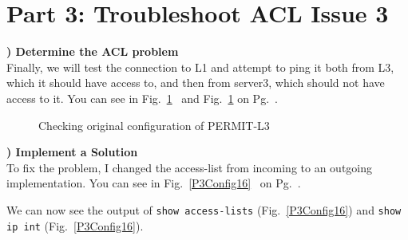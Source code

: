 \documentclass{report}
\newcommand{\mysection}[1]{\section*{#1}}
\newcommand{\mysubsection}[2]{\textbf{\romannumeral #1) #2}}
\begin{document}
\clearpage


\mysection{\textbf{Part 3: Troubleshoot ACL Issue 3}}


\mysubsection{1}{Determine the ACL problem}\\
Finally, we will test the connection to L1 and attempt to ping it both from L3, which
it should have access to, and then from server3, which should not have access
to it.
You can see in Fig.~\ref{P3Net16}~ and
Fig.~\ref{P3Net16}
on Pg.~\pageref{P3Net16}.


\begin{figure}[!hbt]\centering
{}\hfill
{}\par 
{}
\caption{Checking original configuration of PERMIT-L3}\label{P3Net16}
\end{figure}



\noindent\mysubsection{2}{Implement a Solution}\\
To fix the problem, I changed the access-list from incoming to an outgoing
implementation. You can see in Fig.~\ref{P3Config16}~ 
on Pg.~\pageref{P3Config16}. 

We can now see the output of 
{\scriptsize{\verb$show access-lists$}\normalsize}
(Fig.~\ref{P3Config16}) and 
{\scriptsize{\verb$show ip int$}\normalsize}
(Fig.~\ref{P3Config16}).
\end{document}
